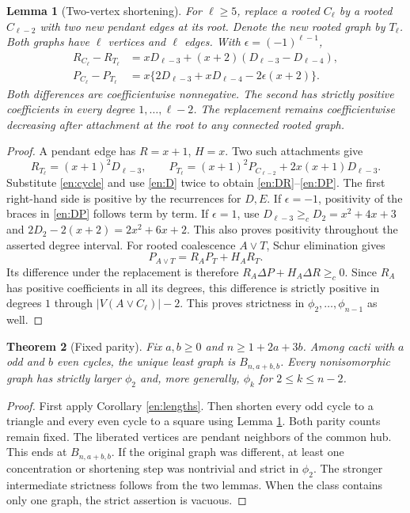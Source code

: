 \documentclass[12pt]{amsart}
\newtheorem{thm}{Theorem}[section]
\newtheorem{lem}[thm]{Lemma}
\theoremstyle{definition}
\theoremstyle{remark}
\numberwithin{equation}{section}
\begin{document}
\begin{lem}[Two-vertex shortening]\label{en:shorten}
For $\ell\ge5$, replace a rooted $C_\ell$ by a rooted $C_{\ell-2}$
with two new pendant edges at its root. Denote the new rooted graph by
$T_\ell$. Both graphs have $\ell$ vertices and $\ell$ edges. With
$\epsilon=(-1)^{\ell-1}$,
\begin{align}
 R_{C_\ell}-R_{T_\ell}
  &=xD_{\ell-3}+(x+2)(D_{\ell-3}-D_{\ell-4}),\label{en:DR}\\
 P_{C_\ell}-P_{T_\ell}
  &=x\{2D_{\ell-3}+xD_{\ell-4}-2\epsilon(x+2)\}.\label{en:DP}
\end{align}
Both differences are coefficientwise nonnegative. The second has strictly
positive coefficients in every degree $1,\ldots,\ell-2$.
The replacement remains coefficientwise decreasing after attachment
at the root to any connected rooted graph.
\end{lem}
\begin{proof}
A pendant edge has $R=x+1$, $H=x$. Two such attachments give
\[
 R_{T_\ell}=(x+1)^2D_{\ell-3},\qquad
 P_{T_\ell}=(x+1)^2P_{C_{\ell-2}}
                      +2x(x+1)D_{\ell-3}.
\]
Substitute \eqref{en:cycle} and use \eqref{en:D} twice to obtain
\eqref{en:DR}--\eqref{en:DP}. The first right-hand side is positive
by the recurrences for $D,E$. If $\epsilon=-1$, positivity of the
braces in \eqref{en:DP} follows term by term. If $\epsilon=1$, use
$D_{\ell-3}\ge_c D_2=x^2+4x+3$ and
$2D_2-2(x+2)=2x^2+6x+2$. This also proves positivity throughout the
asserted degree interval.
For rooted coalescence $A\vee T$, Schur elimination gives
\begin{equation}\label{en:coalesce}
 P_{A\vee T}=R_A P_T+H_A R_T.
\end{equation}
Its difference under the replacement is therefore
$R_A\Delta P+H_A\Delta R\ge_c0$. Since $R_A$ has positive coefficients
in all its degrees, this difference is strictly positive in degrees
$1$ through $|V(A\vee C_\ell)|-2$. This proves strictness in
$\phi_2,\ldots,\phi_{n-1}$ as well.
\end{proof}

\begin{thm}[Fixed parity]\label{en:parity}
Fix $a,b\ge0$ and $n\ge1+2a+3b$. Among cacti with $a$ odd and $b$
even cycles, the unique least graph is
$B_{n,a+b,b}$. Every nonisomorphic graph has strictly larger $\phi_2$
and, more generally, $\phi_k$ for $2\le k\le n-2$.
\end{thm}
\begin{proof}
First apply Corollary \ref{en:lengths}. Then shorten every odd cycle
to a triangle and every even cycle to a square using Lemma
\ref{en:shorten}. Both parity counts remain fixed. The liberated vertices
are pendant neighbors of the common hub. This ends at $B_{n,a+b,b}$.
If the original graph was different, at least one concentration or
shortening step was nontrivial and strict in $\phi_2$. The stronger
intermediate strictness follows from the two lemmas. When the class
contains only one graph, the strict assertion is vacuous.
\end{proof}
\end{document}

